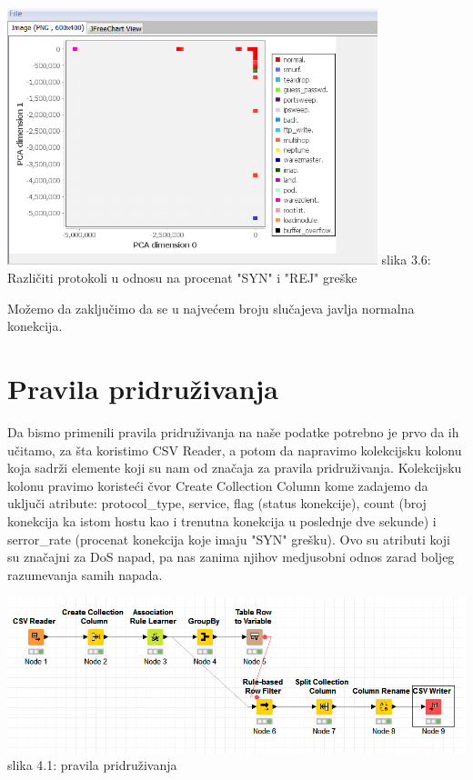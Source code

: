 \documentclass[10pt]{article}
\begin{document}
\begin{center}
\includegraphics[width = \textwidth,  height = 7.5cm]{vizuelizacija6}
slika 3.6: Razli\v citi protokoli u odnosu na procenat "SYN" i "REJ" gre\v ske\\
\end{center}

Mo\v zemo da zaklju\v cimo da se u najve\' cem broju slu\v cajeva javlja normalna konekcija.

\section{Pravila pridru\v zivanja}

Da bismo primenili pravila pridru\v zivanja na na\v se podatke potrebno je prvo da ih u\v citamo, za \v sta koristimo CSV Reader, a potom da napravimo kolekcijsku kolonu koja sadr\v zi elemente koji su nam od zna\v caja za pravila pridru\v zivanja. Kolekcijsku kolonu pravimo koriste\' ci \v cvor Create Collection Column kome zadajemo da uklju\v ci atribute: protocol\_type, service, flag (status konekcije), count (broj konekcija ka istom hostu kao i trenutna konekcija u poslednje dve sekunde) i serror\_rate (procenat konekcija koje imaju "SYN" gre\v sku). Ovo su atributi koji su zna\v cajni za DoS napad, pa nas zanima njihov medjusobni odnos zarad boljeg razumevanja samih napada. 

\begin{center}
\includegraphics[width = \textwidth]{PP1}
slika 4.1: pravila pridru\v zivanja\\
\end{center}
\end{document}
